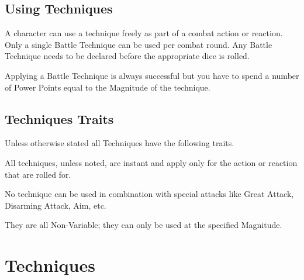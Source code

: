 \subsection{Using Techniques}
A character can use a technique freely as part of a combat action or reaction. Only a single Battle Technique can be used per combat round. Any Battle Technique needs to be declared before the appropriate dice is rolled.

Applying a Battle Technique is always successful but you have to spend a number of Power Points equal to the Magnitude of the technique.


\subsection{Techniques Traits}
Unless otherwise stated all Techniques have the following traits.

\begin{rpg-list}
\item All techniques, unless noted, are instant and apply only for the action or reaction that are rolled for.
\item No technique can be used in combination with special attacks like Great Attack, Disarming Attack, Aim, etc.
\item They are all Non-Variable; they can only be used at the specified Magnitude.
\end{rpg-list}


\section{Techniques}

